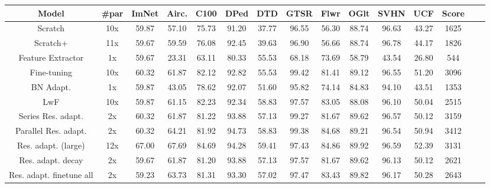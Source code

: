 \documentclass[10pt,twocolumn,letterpaper]{article}
\begin{document}
	\begin{center}
		\begin{tabular}{c  c c c c c c c c c c c c c c} 
\hline
Model	& \#par  & ImNet  & Airc. & C100  & DPed & DTD & GTSR & Flwr & OGlt & SVHN  &UCF   & Score \\
\hline
Scratch	& 10x  & 59.87  & 57.10 & 75.73 & 91.20 & 37.77 & 96.55  & 56.30  & 88.74 &96.63  & 43.27 & 1625   \\

Scratch+ \cite{rebuffi2017learning} & 11x  & 59.67  & 59.59 & 76.08 & 92.45 & 39.63 & 96.90  & 56.66 & 88.74 & 96.78 & 44.17 & 1826   \\

Feature Extractor& 1x  & 59.67  &  23.31 & 63.11 & 80.33  & 55.53 & 68.18 & 73.69  & 58.79  & 43.54   & 26.80 & 544 \\

Fine-tuning	\cite{rebuffi2018efficient} & 10x  & 60.32 & 61.87 & 82.12 & 92.82 & 55.53 &99.42  & 81.41  & 89.12  & 96.55 & 51.20 & 3096    \\

BN Adapt. \cite{bilen2017universal}	&1x  & 59.87  & 43.05 & 78.62 & 92.07& 51.60& 95.82 & 74.14  & 84.83  & 94.10  & 43.51 &  1353  \\

LwF	\cite{li2017learning} &  10x & 59.87 & 61.15 & 82.23 & 92.34 & 58.83 & 97.57  & 83.05  & 88.08  & 96.10  & 50.04 &2515    \\

Series Res. adapt. \cite{rebuffi2017learning}	& 2x & 60.32 & 61.87  & 81.22&  93.88& 57.13   & 99.27  & 81.67  &  89.62 & 96.57& 50.12 & 3159  \\

Parallel Res. adapt. \cite{rebuffi2018efficient} & 2x  & 60.32 & 64.21 & 81.92 & 94.73 & 58.83 & 99.38 & 84.68   & 89.21 & 96.54& 50.94 & 3412  \\

Res. adapt. (large) \cite{rebuffi2017learning} &12x & 67.00 & 67.69 & 84.69 & 94.28  & 59.41 & 97.43 & 84.86 & 89.92  & 96.59 & 52.39 & 3131 \\

Res. adapt. decay \cite{rebuffi2017learning} & 2x & 59.67 & 61.87 & 81.20  & 93.88 & 57.13 & 97.57& 81.67 & 89.62   & 96.13 & 50.12 & 2621  \\
Res. adapt. finetune all \cite{rebuffi2017learning} & 2x &  59.23 & 63.73  & 81.31  & 93.30 & 57.02  & 97.47  &  83.43   & 89.82&  96.17 &  50.28 & 2643 \\


\end{tabular}
\end{center}
\end{document}
